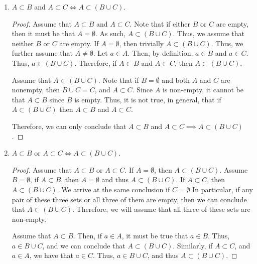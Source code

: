 \documentclass[12pt]{article}
\begin{document}
\begin{enumerate}[label=(\alph*)]
	\item $A \subset B$ and $A \subset C \iff A \subset (B \cup C)$.
	\begin{proof}
		Assume that $A \subset B$ and $A \subset C$. Note that if either $B$ or $C$ are empty,
		then it must be that $A = \emptyset$. As such, $A \subset (B \cup C)$. Thus, we assume that 
		neither $B$ or $C$ are empty. If $A = \emptyset$, then trivially $A \subset (B \cup C)$.
		Thus, we further assume that $A \neq \emptyset$. Let $a \in A$. Then, by definition, 
		$a \in B$ and $a \in C$. Thus, $a \in (B \cup C)$. Therefore, if $A \subset B$ and 
		$A \subset C$, then $A \subset (B \cup C)$.
		
		Assume that $A \subset (B \cup C)$. Note that if $B = \emptyset$ and both $A$ and $C$ are
		nonempty, then $B \cup C = C$, and $A \subset C$. Since $A$ is non-empty, it cannot be
		that $A \subset B$ since $B$ is empty. Thus, it is not true, in general, that 
		if $A \subset (B \cup C)$ then $A \subset B$ and $A \subset C$.
		
		Therefore, we can only conclude that $A \subset B$ and $A \subset C \implies A \subset (B \cup C)$.
	\end{proof}
	\item $A \subset B$ or $A \subset C \iff A \subset (B \cup C)$. 
	\begin{proof}
		Assume that $A \subset B$ or $A \subset C$. If $A = \emptyset$, then $A \subset  (B \cup C)$.
		Assume $B = \emptyset$, if $A \subset B$, then $A = \emptyset$ and thus $A \subset (B \cup C)$.
		If $A \subset C$, then $A \subset (B \cup C)$. We arrive at the same conclusion if $C = \emptyset$
		In particular, if any pair of these three sets or all three of them are empty, then we can
		conclude that $A \subset (B \cup C)$. Therefore, we will assume that all three of these sets 
		are non-empty.
		
		Assume that $A \subset B$. Then, if $a \in A$, it must be true that $a \in B$. Thus,
		$a \in B \cup C$, and we can conclude that $A \subset (B \cup C)$. Similarly, if $A \subset C$,
		and $a \in A$, we have that $a \in C$. Thus, $a \in B \cup C$, and thus $A \subset (B \cup C)$.
		

\end{proof}
\end{enumerate}
\end{document}
